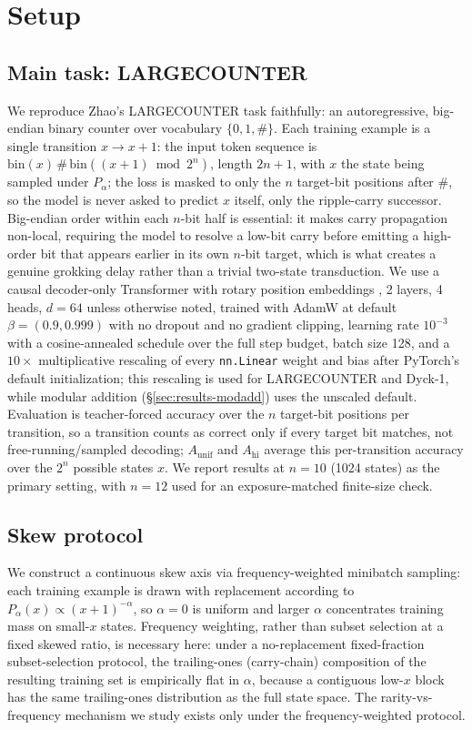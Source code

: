 \documentclass[11pt]{article}
\begin{document}
\section{Setup}

\subsection{Main task: LARGECOUNTER}
We reproduce Zhao's LARGECOUNTER task faithfully: an autoregressive, big-endian binary counter over vocabulary $\{0,1,\#\}$. Each training example is a single transition $x\to x+1$: the input token sequence is $\mathrm{bin}(x)\,\#\,\mathrm{bin}((x+1)\bmod 2^n)$, length $2n+1$, with $x$ the state being sampled under $P_\alpha$; the loss is masked to only the $n$ target-bit positions after \#, so the model is never asked to predict $x$ itself, only the ripple-carry successor. Big-endian order within each $n$-bit half is essential: it makes carry propagation non-local, requiring the model to resolve a low-bit carry before emitting a high-order bit that appears earlier in its own $n$-bit target, which is what creates a genuine grokking delay rather than a trivial two-state transduction. We use a causal decoder-only Transformer \citep{vaswani2017attention} with rotary position embeddings \citep{su2021roformer}, 2 layers, 4 heads, $d=64$ unless otherwise noted, trained with AdamW \citep{loshchilov2019decoupled} at default $\beta=(0.9,0.999)$ with no dropout and no gradient clipping, learning rate $10^{-3}$ with a cosine-annealed schedule over the full step budget, batch size 128, and a $10\times$ multiplicative rescaling of every \texttt{nn.Linear} weight and bias after PyTorch's default initialization; this rescaling is used for LARGECOUNTER and Dyck-1, while modular addition (\S\ref{sec:results-modadd}) uses the unscaled default. Evaluation is teacher-forced accuracy over the $n$ target-bit positions per transition, so a transition counts as correct only if every target bit matches, not free-running/sampled decoding; $A_{\mathrm{unif}}$ and $A_{\mathrm{hi}}$ average this per-transition accuracy over the $2^n$ possible states $x$. We report results at $n=10$ (1024 states) as the primary setting, with $n=12$ used for an exposure-matched finite-size check.

\subsection{Skew protocol}
We construct a continuous skew axis via frequency-weighted minibatch sampling: each training example is drawn with replacement according to $P_\alpha(x)\propto(x+1)^{-\alpha}$, so $\alpha=0$ is uniform and larger $\alpha$ concentrates training mass on small-$x$ states. Frequency weighting, rather than subset selection at a fixed skewed ratio, is necessary here: under a no-replacement fixed-fraction subset-selection protocol, the trailing-ones (carry-chain) composition of the resulting training set is empirically flat in $\alpha$, because a contiguous low-$x$ block has the same trailing-ones distribution as the full state space. The rarity-vs-frequency mechanism we study exists only under the frequency-weighted protocol.
\end{document}
